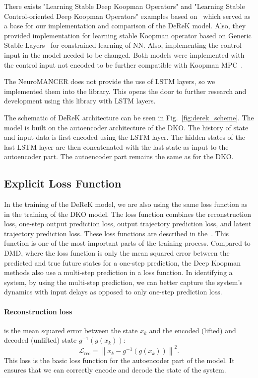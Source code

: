 \documentclass[conference]{IEEEtran}
\begin{document}
There exists "Learning Stable Deep Koopman Operators" and "Learning Stable Control-oriented Deep Koopman Operators" examples based on~\cite{shi2022deep, korda2020optimal,lusch2018deep} which served as a base for our implementation and comparison of the DeReK model. Also, they provided implementation for learning stable Koopman operator based on Generic Stable Layers~\cite{skomski2021constrained, drgovna2022dissipative, zhang2018stabilizing} for constrained learning of NN. Also, implementing the control input in the model needed to be changed. Both models were implemented with the control input not encoded to be further compatible with Koopman MPC~\cite{korda2018linear}. 

The NeuroMANCER does not provide the use of LSTM layers, so we implemented them into the library. This opens the door to further research and development using this library with LSTM layers. 

The schematic of DeReK architecture can be seen in Fig.~\ref{fig:derek_scheme}. The model is built on the autoencoder architecture of the DKO. The history of state and input data is first encoded using the LSTM layer. The hidden states of the last LSTM layer are then concatenated with the last state as input to the autoencoder part. The autoencoder part remains the same as for the DKO.

\subsection{Explicit Loss Function}
In the training of the DeReK model, we are also using the same loss function as in the training of the DKO model. The loss function combines the reconstruction loss, one-step output prediction loss, output trajectory prediction loss, and latent trajectory prediction loss. These loss functions are described in the~\cite{lusch2018deep}. This function is one of the most important parts of the training process. Compared to DMD, where the loss function is only the mean squared error between the predicted and true future states for a one-step prediction, the Deep Koopman methods also use a multi-step prediction in a loss function. In identifying a system, by using the multi-step prediction, we can better capture the system's dynamics with input delays as opposed to only one-step prediction loss.

\paragraph*{Reconstruction loss}
is the mean squared error between the state $x_k$ and the encoded (lifted) and decoded (unlifted) state $g^{-1}(g(x_k))$:
\begin{equation}
    \mathcal{L}_{\text{rec}} = \left\|x_k - g^{-1}(g(x_k))\right\|^2.
\end{equation}
This loss is the basic loss function for the autoencoder part of the model. It ensures that we can correctly encode and decode the state of the system.
\end{document}
